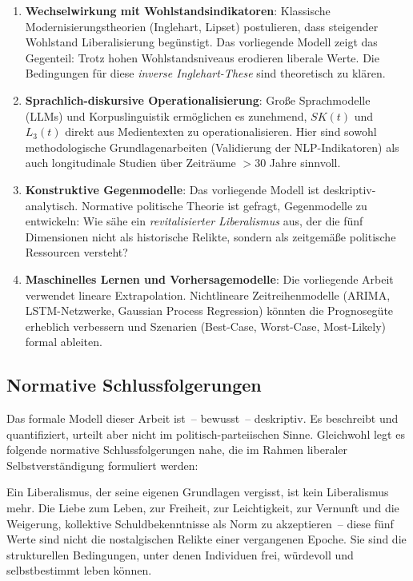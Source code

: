 ﻿\documentclass[a4paper,12pt]{article}
\theoremstyle{definition}
\begin{document}
\begin{enumerate}
	\item \textbf{Wechselwirkung mit Wohlstandsindikatoren}: Klassische Modernisierungstheorien (Inglehart, Lipset) postulieren, dass steigender Wohlstand Liberalisierung begünstigt. Das vorliegende Modell zeigt das Gegenteil: Trotz hohen Wohlstandsniveaus erodieren liberale Werte. Die Bedingungen für diese \emph{inverse Inglehart-These} sind theoretisch zu klären.
	
	\item \textbf{Sprachlich-diskursive Operationalisierung}: Große Sprachmodelle (LLMs) und Korpuslinguistik ermöglichen es zunehmend, $SK(t)$ und $L_3(t)$ direkt aus Medientexten zu operationalisieren. Hier sind sowohl methodologische Grundlagenarbeiten (Validierung der NLP-Indikatoren) als auch longitudinale Studien über Zeiträume $>30$ Jahre sinnvoll.
	
	\item \textbf{Konstruktive Gegenmodelle}: Das vorliegende Modell ist deskriptiv-analytisch. Normative politische Theorie ist gefragt, Gegenmodelle zu entwickeln: Wie sähe ein \emph{revitalisierter Liberalismus} aus, der die fünf Dimensionen nicht als historische Relikte, sondern als zeitgemäße politische Ressourcen versteht?
	
	\item \textbf{Maschinelles Lernen und Vorhersagemodelle}: Die vorliegende Arbeit verwendet lineare Extrapolation. Nichtlineare Zeitreihenmodelle (ARIMA, LSTM-Netzwerke, Gaussian Process Regression) könnten die Prognosegüte erheblich verbessern und Szenarien (Best-Case, Worst-Case, Most-Likely) formal ableiten.
\end{enumerate}

\subsection{Normative Schlussfolgerungen}

Das formale Modell dieser Arbeit ist~-- bewusst~-- deskriptiv. Es beschreibt und quantifiziert, urteilt aber nicht im politisch-parteiischen Sinne. Gleichwohl legt es folgende normative Schlussfolgerungen nahe, die im Rahmen liberaler Selbstverständigung formuliert werden:

Ein Liberalismus, der seine eigenen Grundlagen vergisst, ist kein Liberalismus mehr. Die Liebe zum Leben, zur Freiheit, zur Leichtigkeit, zur Vernunft und die Weigerung, kollektive Schuldbekenntnisse als Norm zu akzeptieren~-- diese fünf Werte sind nicht die nostalgischen Relikte einer vergangenen Epoche. Sie sind die strukturellen Bedingungen, unter denen Individuen frei, würdevoll und selbstbestimmt leben können.
\end{document}

